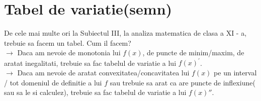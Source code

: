 \documentclass[11pt]{article}
\begin{document}
\section*{Tabel de variatie(semn)}
\begin{flushleft}
    \qquad  De cele mai multe ori la Subiectul III, la analiza matematica de clasa a XI - a, trebuie sa  
            facem un tabel. Cum il facem? \\
    $\longrightarrow$ Daca am nevoie de monotonia lui $f(x)$, de puncte de minim/maxim, de aratat 
    inegalitati, trebuie sa fac tabelul de variatie a lui $f(x)^\prime$. \\
    $\longrightarrow$ Daca am nevoie de aratat convexitatea/concavitatea lui $f(x)$ pe un interval / tot
    domeniul de definitie a lui $f$ sau trebuie sa arat ca are puncte de inflexiune( sau sa le si calculez),
    trebuie sa fac tabelul de variatie a lui $f(x)''$.
    

\end{flushleft}
\end{document}
